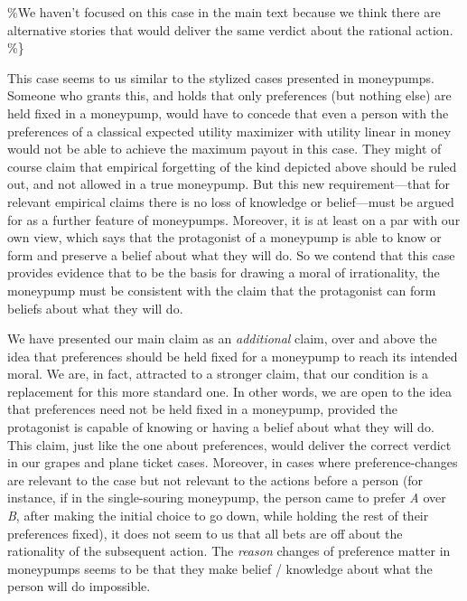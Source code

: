 \documentclass[
  11pt,
  letterpaper,
  DIV=11,
  numbers=noendperiod,
  twoside]{scrartcl}
\begin{document}
\%We haven't focused on this case in the main text because we think
there are alternative stories that would deliver the same verdict about
the rational action. \%\}

This case seems to us similar to the stylized cases presented in
moneypumps. Someone who grants this, and holds that only preferences
(but nothing else) are held fixed in a moneypump, would have to concede
that even a person with the preferences of a classical expected utility
maximizer with utility linear in money would not be able to achieve the
maximum payout in this case. They might of course claim that empirical
forgetting of the kind depicted above should be ruled out, and not
allowed in a true moneypump. But this new requirement---that for
relevant empirical claims there is no loss of knowledge or belief---must
be argued for as a further feature of moneypumps. Moreover, it is at
least on a par with our own view, which says that the protagonist of a
moneypump is able to know or form and preserve a belief about what they
will do. So we contend that this case provides evidence that to be the
basis for drawing a moral of irrationality, the moneypump must be
consistent with the claim that the protagonist can form beliefs about
what they will do.

We have presented our main claim as an \emph{additional} claim, over and
above the idea that preferences should be held fixed for a moneypump to
reach its intended moral. We are, in fact, attracted to a stronger
claim, that our condition is a replacement for this more standard one.
In other words, we are open to the idea that preferences need not be
held fixed in a moneypump, provided the protagonist is capable of
knowing or having a belief about what they will do. This claim, just
like the one about preferences, would deliver the correct verdict in our
grapes and plane ticket cases. Moreover, in cases where
preference-changes are relevant to the case but not relevant to the
actions before a person (for instance, if in the single-souring
moneypump, the person came to prefer \emph{A} over \emph{B}, after
making the initial choice to go down, while holding the rest of their
preferences fixed), it does not seem to us that all bets are off about
the rationality of the subsequent action. The \emph{reason} changes of
preference matter in moneypumps seems to be that they make belief /
knowledge about what the person will do impossible.
\end{document}

